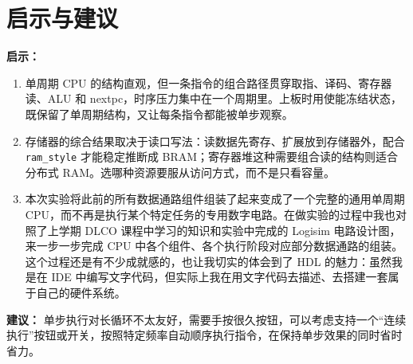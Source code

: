 \documentclass[12pt, a4paper]{ctexart}
\begin{document}
\section{启示与建议}

\textbf{启示：}
\begin{enumerate}
    \item 单周期 CPU 的结构直观，但一条指令的组合路径贯穿取指、译码、寄存器读、ALU 和 nextpc，时序压力集中在一个周期里。上板时用使能冻结状态，既保留了单周期结构，又让每条指令都能被单步观察。
    \item 存储器的综合结果取决于读口写法：读数据先寄存、扩展放到存储器外，配合 \texttt{ram\_style} 才能稳定推断成 BRAM；寄存器堆这种需要组合读的结构则适合分布式 RAM。选哪种资源要服从访问方式，而不是只看容量。
    \item 本次实验将此前的所有数据通路组件组装了起来变成了一个完整的通用单周期 CPU，而不再是执行某个特定任务的专用数字电路。在做实验的过程中我也对照了上学期 DLCO 课程中学习的知识和实验中完成的 Logisim 电路设计图，来一步一步完成 CPU 中各个组件、各个执行阶段对应部分数据通路的组装。这个过程还是有不少成就感的，也让我切实的体会到了 HDL 的魅力：虽然我是在 IDE 中编写文字代码，但实际上我在用文字代码去描述、去搭建一套属于自己的硬件系统。
\end{enumerate}

\textbf{建议：} 单步执行对长循环不太友好，需要手按很久按钮，可以考虑支持一个“连续执行”按钮或开关，按照特定频率自动顺序执行指令，在保持单步效果的同时省时省力。
\end{document}

